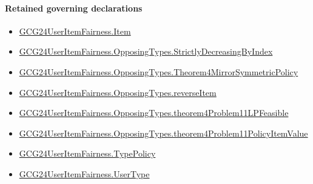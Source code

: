 \documentclass[10pt]{article}
\begin{document}
\paragraph{Retained governing declarations}
\begin{itemize}\raggedright
\item \hyperlink{governing-declaration-a7c560a429c6e204}{GCG24\allowbreak{}User\allowbreak{}Item\allowbreak{}Fairness.\allowbreak{}Item}
\item \hyperlink{governing-declaration-8278344d2ddef9a8}{GCG24\allowbreak{}User\allowbreak{}Item\allowbreak{}Fairness.\allowbreak{}Opposing\allowbreak{}Types.\allowbreak{}Strictly\allowbreak{}Decreasing\allowbreak{}By\allowbreak{}Index}
\item \hyperlink{governing-declaration-00d15cf288402d6b}{GCG24\allowbreak{}User\allowbreak{}Item\allowbreak{}Fairness.\allowbreak{}Opposing\allowbreak{}Types.\allowbreak{}Theorem4\allowbreak{}Mirror\allowbreak{}Symmetric\allowbreak{}Policy}
\item \hyperlink{governing-declaration-c12a8e29d370ae70}{GCG24\allowbreak{}User\allowbreak{}Item\allowbreak{}Fairness.\allowbreak{}Opposing\allowbreak{}Types.\allowbreak{}reverse\allowbreak{}Item}
\item \hyperlink{governing-declaration-8c4140d04ab0e31c}{GCG24\allowbreak{}User\allowbreak{}Item\allowbreak{}Fairness.\allowbreak{}Opposing\allowbreak{}Types.\allowbreak{}theorem4\allowbreak{}Problem11\allowbreak{}LP\allowbreak{}Feasible}
\item \hyperlink{governing-declaration-9dd6ffc03d249aa8}{GCG24\allowbreak{}User\allowbreak{}Item\allowbreak{}Fairness.\allowbreak{}Opposing\allowbreak{}Types.\allowbreak{}theorem4\allowbreak{}Problem11\allowbreak{}Policy\allowbreak{}Item\allowbreak{}Value}
\item \hyperlink{governing-declaration-dc7776cb642fa9dc}{GCG24\allowbreak{}User\allowbreak{}Item\allowbreak{}Fairness.\allowbreak{}Type\allowbreak{}Policy}
\item \hyperlink{governing-declaration-fd2c25ccc96ab645}{GCG24\allowbreak{}User\allowbreak{}Item\allowbreak{}Fairness.\allowbreak{}User\allowbreak{}Type}
\end{itemize}
\end{document}
